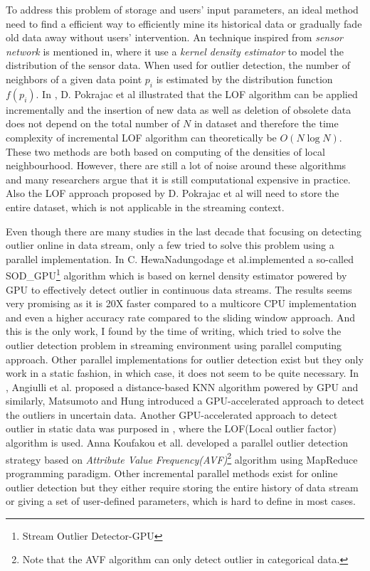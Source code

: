 \documentclass[11pt]{article}       %
\begin{document}
To address this problem of storage and users' input parameters, an ideal method need to find a efficient way to efficiently mine its historical data or gradually fade old data away without users' intervention. An technique inspired from \textit{sensor network} is mentioned in\cite{Subramaniam:2006:OOD:1182635.1164145}, where it use a \textit{kernel density estimator} to model the distribution of the sensor data. When used for outlier detection, the number of neighbors of a given data point $p_{i}$ is estimated by the distribution function $f(p_{i})$. In \cite{4221341}, D. Pokrajac et al illustrated that the LOF algorithm can be applied incrementally and the insertion of new data as well as deletion of obsolete data does not depend on the total number of $N$ in dataset and therefore the time complexity of incremental LOF algorithm can theoretically be $O(N\log{N})$. These two methods are both based on computing of the densities of local neighbourhood. However, there are still a lot of noise around these algorithms and many researchers argue that it is still computational expensive in practice. Also the LOF approach proposed by D. Pokrajac et al will need to store the entire dataset, which is not applicable in the streaming context.

Even though there are many studies in the last decade that focusing on detecting outlier online in data stream, only a few tried to solve this problem using a parallel implementation. In \cite{7516110} C. HewaNadungodage et al.implemented a so-called SOD\_GPU\footnote{Stream Outlier Detector-GPU} algorithm which is based on kernel density estimator powered by GPU to effectively detect outlier in continuous data streams. The results seems very promising as it is 20X faster compared to a multicore CPU implementation and even a higher accuracy rate compared to the sliding window approach. And this is the only work, I found by the time of writing, which tried to solve the outlier detection problem in streaming environment using parallel computing approach. Other parallel implementations for outlier detection exist but they only work in a static fashion, in which case, it does not seem to be quite necessary. In \cite{6641405},  Angiulli et al. proposed a distance-based KNN algorithm powered by GPU and similarly, Matsumoto and Hung\cite{Matsumoto2012} introduced a GPU-accelerated approach to detect the outliers in uncertain data. Another GPU-accelerated approach to detect outlier in static data was purposed in \cite{Alshawabkeh:2010:ALO:1735688.1735707}, where the LOF(Local outlier factor) algorithm is used. Anna Koufakou et all.\cite{4634266} developed a parallel outlier detection strategy based on \textit{Attribute Value Frequency(AVF)}\cite{4410382}\footnote{Note that the AVF algorithm can only detect outlier in categorical data.} algorithm using MapReduce programming paradigm. Other incremental parallel methods exist for online outlier detection but they either require storing the entire history of data stream or giving a set of user-defined parameters, which is hard to define in most cases. 
\end{document}
